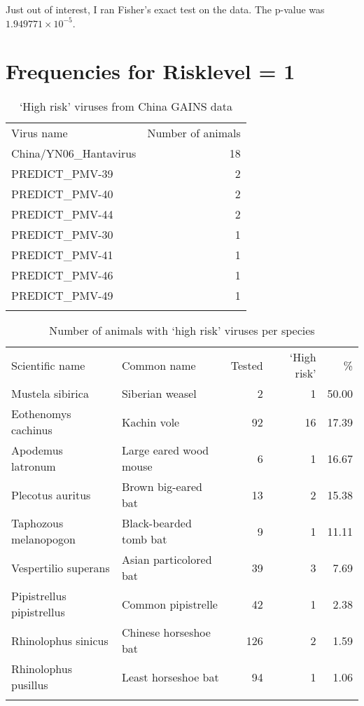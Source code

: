 \documentclass[11pt,article,oneside]{article}
\begin{document}
Just out of interest, I ran Fisher's exact test on the data. The p-value
was $1.949771\times 10^{-5}$.

\section{Frequencies for Risklevel =
1}\label{frequencies-for-risklevel-1}

\begin{longtable}[c]{@{}lr@{}}
\toprule\addlinespace
Virus name & Number of animals
\\\addlinespace
\midrule\endhead
China/YN06\_Hantavirus & 18
\\\addlinespace
PREDICT\_PMV-39 & 2
\\\addlinespace
PREDICT\_PMV-40 & 2
\\\addlinespace
PREDICT\_PMV-44 & 2
\\\addlinespace
PREDICT\_PMV-30 & 1
\\\addlinespace
PREDICT\_PMV-41 & 1
\\\addlinespace
PREDICT\_PMV-46 & 1
\\\addlinespace
PREDICT\_PMV-49 & 1
\\\addlinespace
\bottomrule
\addlinespace
\caption{`High risk' viruses from China GAINS data}
\end{longtable}

\begin{longtable}[c]{@{}llrrr@{}}
\toprule\addlinespace
Scientific name & Common name & Tested & `High risk' & \%
\\\addlinespace
\midrule\endhead
Mustela sibirica & Siberian weasel & 2 & 1 & 50.00
\\\addlinespace
Eothenomys cachinus & Kachin vole & 92 & 16 & 17.39
\\\addlinespace
Apodemus latronum & Large eared wood mouse & 6 & 1 & 16.67
\\\addlinespace
Plecotus auritus & Brown big-eared bat & 13 & 2 & 15.38
\\\addlinespace
Taphozous melanopogon & Black-bearded tomb bat & 9 & 1 & 11.11
\\\addlinespace
Vespertilio superans & Asian particolored bat & 39 & 3 & 7.69
\\\addlinespace
Pipistrellus pipistrellus & Common pipistrelle & 42 & 1 & 2.38
\\\addlinespace
Rhinolophus sinicus & Chinese horseshoe bat & 126 & 2 & 1.59
\\\addlinespace
Rhinolophus pusillus & Least horseshoe bat & 94 & 1 & 1.06
\\\addlinespace
\bottomrule
\addlinespace
\caption{Number of animals with `high risk' viruses per species}
\end{longtable}
\end{document}
